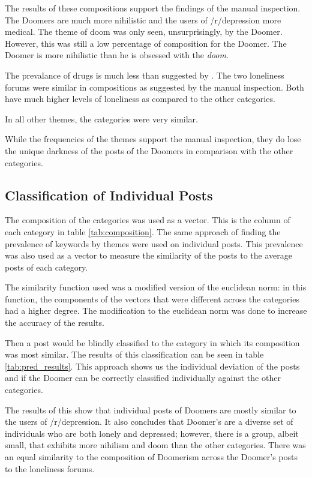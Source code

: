 \documentclass[../report.tex]{subfiles}
\begin{document}
The results of these compositions support the findings of the manual inspection. 
The Doomers are much more nihilistic and the users of /r/depression more medical.
The theme of doom was only seen, unsurprisingly, by the Doomer.
However, this was still a low percentage of composition for the Doomer. 
The Doomer is more nihilistic than he is obsessed with the \textit{doom}.

The prevalance of drugs is much less than suggested by \cite*{twitter_loneliness}.
The two loneliness forums were similar in compositions as suggested by the manual inspection. 
Both have much higher levels of loneliness as compared to the other categories. 

In all other themes, the categories were very similar. 

While the frequencies of the themes support the manual inspection, they do lose the unique darkness of the posts of the Doomers in comparison with the other categories.



\subsection{Classification of Individual Posts}
The composition of the categories was used as a vector. 
This is the column of each category in table \ref{tab:composition}.
The same approach of finding the prevalence of keywords by themes were used on individual posts.
This prevalence was also used as a vector to measure the similarity of the posts to the average posts of each category. 

The similarity function used was a modified version of the euclidean norm: in this function, the components of the vectors that were different across the categories had a higher degree. 
The modification to the euclidean norm was done to increase the accuracy of the results.

Then a post would be blindly classified to the category in which its composition was most similar. 
The results of this classification can be seen in table \ref{tab:pred_results}.
This approach shows us the individual deviation of the posts and if the Doomer can be correctly classified individually against the other categories.

The results of this show that individual posts of Doomers are mostly similar to the users of /r/depression. 
It also concludes that Doomer's are a diverse set of individuals who are both lonely and depressed; however, there is a group, albeit small, that exhibits more nihilism and doom than the other categories.
There was an equal similarity to the composition of Doomerism across the Doomer's posts to the loneliness forums.
\end{document}
